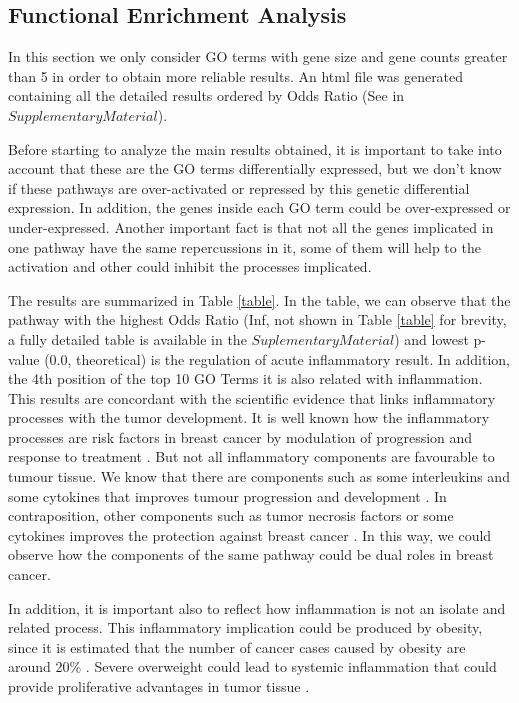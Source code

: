 \documentclass[9pt,twocolumn,twoside]{gsajnl}
\begin{document}
\subsection*{Functional Enrichment Analysis} 
\vspace{2mm}

In this section we only 
consider GO terms with gene size and gene counts greater than 5 in order to obtain more reliable results. An html file was generated containing all the detailed results ordered by Odds Ratio (See in $Supplementary Material$).
\vspace{2mm}

Before starting to analyze the main results obtained, it is important to take into account that these are the GO terms differentially expressed, but we don't know if these pathways are over-activated or repressed by this genetic differential expression. In addition, the genes inside each GO term could be over-expressed or under-expressed. Another important fact is that not all the genes implicated in one pathway have the same repercussions in it, some of them will help to the activation and other could inhibit the processes implicated. 
\vspace{2mm}

The results are summarized in Table \ref{table}. In the table, we can observe that the pathway with the highest Odds Ratio (Inf, not shown in Table \ref{table} for brevity, a fully detailed table is available in the $Suplementary Material$) and lowest p-value (0.0, theoretical) is the regulation of acute inflammatory result. In addition, the 4th position of the top 10 GO Terms it is also related with inflammation. This results are concordant with the scientific evidence that links inflammatory processes with the tumor development. It is well known how the inflammatory processes are risk factors in breast cancer by modulation of progression and response to treatment \citep{Murray01022015}. But not all inflammatory components are favourable to tumour tissue. We know that there are components such as some interleukins and some cytokines that improves tumour progression and development \citep{Esquivel-Velzquez2014}. In contraposition, other components such as tumor necrosis factors or some cytokines improves the protection against breast cancer \citep{Esquivel-Velzquez2014}. In this way, we could observe how the components of the same pathway could be dual roles in breast cancer. 
\vspace{2mm}

In addition, it is important also to reflect how inflammation is not an isolate and related process. This inflammatory implication could be produced by obesity, since it is estimated that the number of cancer cases caused by obesity are around 20\% \citep{DePergola2013,BaumgartenFrasor}. Severe overweight could lead to systemic inflammation that could provide proliferative advantages in tumor tissue \citep{Iyengar2013}.
\vspace{2mm}
\end{document}
